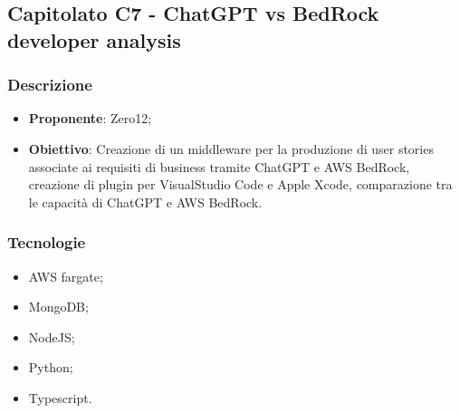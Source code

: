 \subsection{Capitolato C7 - ChatGPT vs BedRock developer analysis}


\subsubsection{Descrizione}
\begin{itemize}
    \item \textbf{Proponente}: Zero12;
    \item \textbf{Obiettivo}: Creazione di un middleware per la produzione di user stories associate ai requisiti di business tramite ChatGPT e AWS BedRock, creazione di plugin per VisualStudio Code e Apple Xcode, comparazione tra le capacità di ChatGPT e AWS BedRock.
\end{itemize}


\subsubsection{Tecnologie}
\begin{itemize}
    \item AWS fargate;
    \item MongoDB;
    \item NodeJS;
    \item Python;
    \item Typescript.
\end{itemize}


